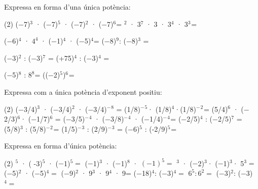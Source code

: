 \begin{mylist}
\exer \spen Expressa en forma d'una única potència:  

\begin{tasks}(2)
\task   ($-$7)${}^{3}$ · ($-$7)${}^{5}$ · ($-$7)${}^{2}$ · ($-$7)${}^{6 }$=    ${}^{2}$ · 3${}^{7}$ · 3 · 3${}^{4}$ · 3${}^{3}$${}^{ }$=

 \task   ($-$6)${}^{4}$ · ${4}^{4}$ · ($-$1)${}^{4}$ · ($-$5)${}^{4}$=   \task  ($-$8)${}^{9}$: ($-$8)${}^{3}$  =

\task   ($-$3)${}^{2}$ :  ($-$3)${}^{7}$ =    \task   (+75)${}^{4}$ : ($-$3)${}^{4}$  =  

 \task  ($-$5)${}^{8}$ : ${8}^{8}$=    \task   (($-$2)${}^{5}$)${}^{6}$${}^{ }$=
\answers{[$(-7)^{16}$, $3^{17}$, $120^4$, $8^6$, $(-3)^{-3}$, $(-25)^4$, $(-5/8)^8$, $(-2)^{30}$]}


 \end{tasks}


\exer  Expressa com a única potència d'exponent positiu:  

\begin{tasks}(2)
\task  (\textbf{$-$}3/4)${}^{3}$ · (\textbf{$-$}3/4)${}^{2}$ · (\textbf{$-$}3/4)\textbf{${}^{-}$}${}^{8}$ =  \task   (1/8)\textbf{${}^{-}$}${}^{5}$· (1/8)${}^{4}$·(1/8)${}^{-}$${}^{2}$${}^{ }$=
\task   (5/4)${}^{6}$ · (\textbf{$-$}2/3)${}^{6}$· (\textbf{$-$}1/7)${}^{6}$ =  \task   (\textbf{$-$}3/5)${}^{-}$${}^{4}$ · (\textbf{$-$}3/8)${}^{-}$${}^{4}$ · (\textbf{$-$}1/4)\textbf{${}^{-}$}${}^{4}$${}^{ }$=
 \task   ($-$2/5)${}^{4}$ : ($-$2/5)${}^{7}$ =   \task    (5/8)${}^{3}$ : (5/8)${}^{-}$${}^{2}$${}^{ }$=
 \task    (1/5)${}^{-}$${}^{3}$ : (2/9)${}^{-}$${}^{3}$ =    \task    ($-$6)${}^{5}$ : (-2/9)${}^{5}$${}^{ }$=
\end{tasks}
 \answers{[$\left(-\frac{4}{3} \right)^{2}$, $\left(\frac{1}{8} \right)^{-3}=8^3$, $\left(\frac{5}{42} \right)^6$, $\left(\frac{160}{9} \right)^4$, $\left(-\frac{5}{2} \right)^3$, $\left(\frac{5}{8} \right)^5$, $\left(\frac{10}{9} \right)^3$, $27^5$]}


\exer Expressa en forma d'única potència:
\begin{tasks}(2)
${}^{5 }$ · ( -3)${}^{5}$ · ($-$1)${}^{5 }=$    \task ($-$1)${}^{3}$ · ($-$1)${}^{8}$ · ${(-1)}^{5}=$ 
${}^{3}$ · ($-$2)${}^{3}$· ($-$1)${}^{3 }$· 5${}^{3}=$    \task ($-$5)${}^{2}$ · ($-$5)${}^{4}=$  
\task ($-$9)${}^{2}$ · 9${}^{3}$ · 9${}^{4}$ · 9=     \task ($-$18)${}^{4}$: ($-$3)${}^{4}=$   
\task ${6}^{5} : {6}^{2}=$     \task ($-$3)${}^{2}$: ($-$3)${}^{4}=$
\end{tasks}
\answers{[$6^5$, $1$, $40^3$, $5^6$, $9^{10}$, $6^4$, $6^3$, $(-3)^{-2}$]} 



\end{mylist}
